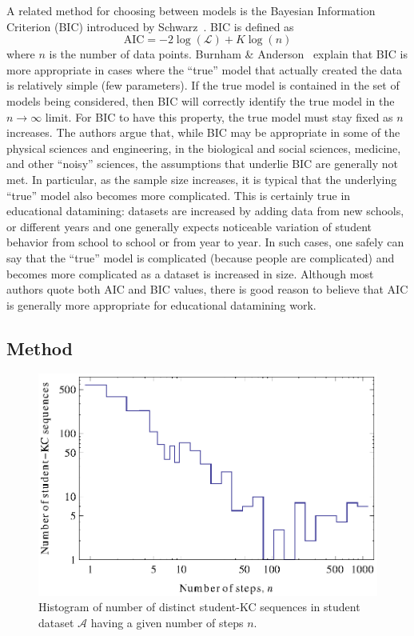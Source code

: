 \documentclass{acmlarge-edm}
\begin{document}
A related method for choosing between models is the Bayesian
Information Criterion (BIC) introduced by
Schwarz~\citeyear{schwarz_estimating_1978}.  BIC is defined as
%
\begin{equation}
   \mathrm{AIC}= -2 \log\left(\mathcal{L}\right) + K \log\left(n\right)
\end{equation}
% 
where $n$ is the number of data points.
Burnham \& Anderson~\citeyear[Sections~6.3 \& 6.4]{burnham_model_2002} explain
that BIC is more appropriate in cases where the ``true'' model that
actually created the data is relatively simple (few parameters).  If
the true model is contained in the set of models being considered,
then BIC will correctly identify the true model in the $n\to\infty$
limit.  For BIC to have this property, the true model must stay fixed as 
$n$ increases.  
The authors argue that, while BIC may be appropriate in some
of the physical sciences and engineering, in the biological and social
sciences, medicine, and other ``noisy'' sciences, the assumptions that
underlie BIC are generally not met.  In particular, as the sample size
increases, it is typical that the underlying ``true'' model also
becomes more complicated.  This is certainly true in educational
datamining: datasets are increased by adding data from new schools, or
different years and one generally expects noticeable variation of student
behavior from school to school or from year to year.  In such cases, one
safely can say that the ``true'' model is complicated (because people are
complicated) and becomes more complicated as a dataset is increased in
size.  Although most authors quote both AIC and BIC values, there
is good reason to believe that AIC is generally more appropriate for
educational datamining work.

\subsection{Method}


\begin{figure}
  \centering \includegraphics{student-kc-length-histogram.eps}
  \caption{Histogram of number of distinct student-KC sequences in student 
    dataset $\mathcal{A}$ having a given number of steps $n$.}
    \label{student-length-histogram}
\end{figure}
\end{document}
